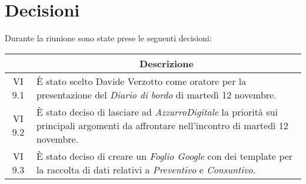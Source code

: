 

\section{Decisioni}

Durante la riunione sono state prese le seguenti decisioni:

\vspace{0.5cm}

\begin{table}[htbp]
    \centering
    \begin{tabular}{|c|p{}|}
        \hline
        \rowcolor[gray]{0.75}
        \multicolumn{1}{|c|}{\textbf{Codice}} & \multicolumn{1}{|c|}{\textbf{Descrizione}}\\
        \hline
        VI 9.1 & È stato scelto Davide Verzotto come oratore per la presentazione del \emph{Diario di bordo} di martedì 12 novembre.\\
        \hline
        VI 9.2 & È stato deciso di lasciare ad \emph{AzzurroDigitale} la priorità sui principali argomenti da affrontare nell'incontro di martedì 12 novembre. \\   
        \hline
        VI 9.3 & È stato deciso di creare un \emph{Foglio Google} con dei template per la raccolta di dati relativi a \emph{Preventivo} e \emph{Consuntivo}.\\
        \hline
    \end{tabular}
\end{table}